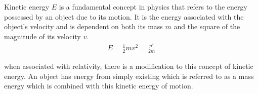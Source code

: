 \begin{defn}
	Kinetic energy $E$ is a fundamental concept in physics that refers to the energy possessed by an object due to its motion. It is the energy associated with the object's velocity and is dependent on both its mass $m$ and the square of the magnitude of its velocity $v$. 
	\begin{align}
		E = \frac{1}{2}mv^2 = \frac{p^2}{2m}
	\end{align}
\end{defn} 

when associated with relativity, there is a modification to this concept of kinetic energy. An object has energy from simply existing which is referred to as a mass energy which is combined with this kinetic energy of motion.







